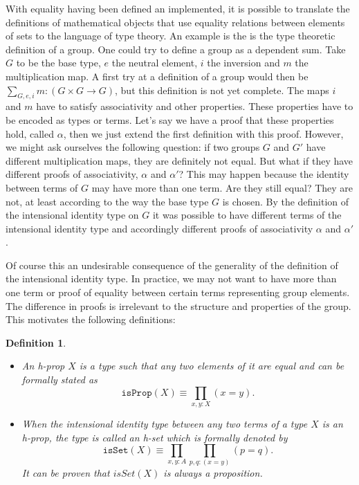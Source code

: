 \documentclass[12pt,a4paper,twoside,xetex]{book}
\newcommand{\keyword}[1]{\emph{#1}\index{#1}}
\newtheorem{definition}[theorem]{Definition}
\newcommand{\op}[1]{\mathtt{#1}}
\begin{document}
With equality having been defined an implemented, it is possible to translate 
the definitions of mathematical objects that use equality relations between 
elements of sets to the language of type theory. An example is the is the type 
theoretic definition of a group. One could try to define a group as a dependent 
sum. Take $G$ to be the base type, $e$ the neutral element, $i$ the inversion 
and $m$ the multiplication map. A first try at a definition of a group would 
then be $\sum_{G,e,i}m:(G\times G \rightarrow G)$, but this definition is not 
yet complete. The maps $i$ and $m$  have to satisfy associativity and other 
properties. These properties have to be encoded as types or terms. Let's say we 
have a proof that these properties hold, called $\alpha$, then we just extend 
the first definition with this proof. However, we might ask ourselves the 
following question: if two groups $G$ and $G'$ have different multiplication 
maps, they are definitely not equal. But what if they have different proofs of 
associativity, $\alpha$ and $\alpha'$? This may happen because the identity 
between terms of  $G$ may have more than one term. Are they still equal? They 
are not, at least according to the way the base type $G$ is chosen. By the 
definition of the intensional identity type on $G$ it was possible to have 
different terms of the intensional identity type and accordingly different 
proofs of associativity $\alpha$ and $\alpha'$.

Of course this an undesirable consequence of the generality of the definition 
of the intensional identity type. In practice, we may not want to have more 
than one term or proof of equality between certain terms representing group 
elements. The difference in proofs is irrelevant to the structure and properties 
of the group. This motivates the following definitions:

\begin{definition}\label{hset}
\begin{itemize}
\item  An \keyword{h-prop} $X$ is a type such that any two elements of it are 
equal and can be formally stated as $$\op{isProp}(X) \equiv 
\prod_{x,y:X}(x=y).$$
\item When the intensional identity type between any two terms of a type $X$ is 
an h-prop, the type is called an \keyword{h-set} which is formally denoted by 
$$\op{isSet}(X) \equiv \prod_{x,y:A}\prod_{p,q:(x=y)}(p=q).$$ It can be proven 
that $isSet(X)$ is always a proposition.
\end{itemize}
\end{definition}
\end{document}
